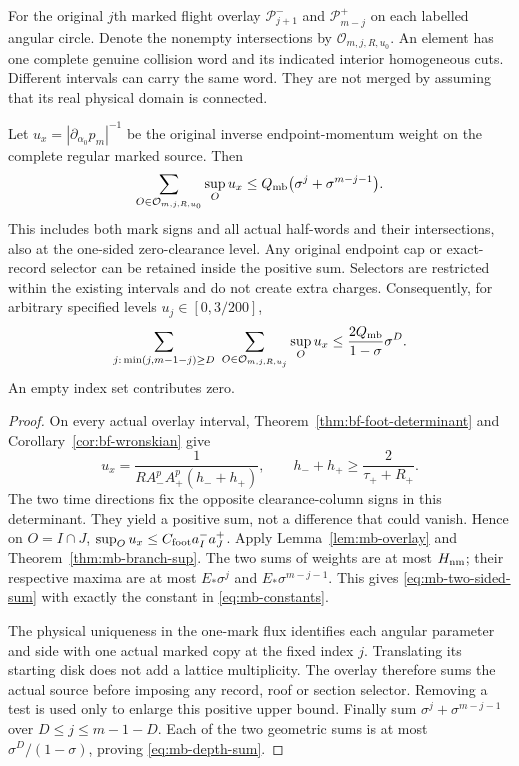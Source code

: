 For the original $j$th marked flight overlay
$\mathcal P_{j+1}^-$ and $\mathcal P_{m-j}^+$ on each labelled
angular circle.  Denote the nonempty intersections by
$\mathcal O_{m,j,R,u_0}$.  An element has one complete genuine
collision word and its indicated interior homogeneous cuts.
Different intervals can carry the same word.  They are not merged
by assuming that its real physical domain is connected.

\begin{theorem}
\label{thm:mb-two-sided-sum}
Let $u_x=|\partial_{\alpha_0}p_m|^{-1}$ be the original inverse
endpoint-momentum weight on the complete regular marked source.
Then
\begin{equation}\label{eq:mb-two-sided-sum}
 \sum_{O\in\mathcal O_{m,j,R,u_0}}\sup_O u_x
       \le Q_{\rm mb}\bigl(\sigma^j+\sigma^{m-j-1}\bigr).
\end{equation}
This includes both mark signs and all actual half-words and their
intersections, also at the one-sided zero-clearance level.
Any original endpoint cap or exact-record selector can be retained
inside the positive sum.  Selectors are restricted within the
existing intervals and do not create extra charges.
Consequently, for arbitrary specified levels $u_j\in[0,3/200]$,
\begin{equation}\label{eq:mb-depth-sum}
 \sum_{j:\,\min(j,m-1-j)\ge D}
 \ \sum_{O\in\mathcal O_{m,j,R,u_j}}\sup_O u_x
       \le\frac{2Q_{\rm mb}}{1-\sigma}\sigma^D .
\end{equation}
An empty index set contributes zero.
\end{theorem}
\begin{proof}
On every actual overlay interval, Theorem~\ref{thm:bf-foot-determinant}
and Corollary~\ref{cor:bf-wronskian} give
\[
 u_x=\frac1{R A_-^pA_+^p(h_-+h_+)},\qquad
 h_-+h_+\ge\frac2{\tau_++R_+}.
\]
The two time directions fix the opposite clearance-column signs
in this determinant.  They yield a positive sum, not a difference
that could vanish.  Hence on $O=I\cap J$,
$\sup_Ou_x\le C_{\rm foot}a_I^-a_J^+$.
Apply Lemma~\ref{lem:mb-overlay} and
Theorem~\ref{thm:mb-branch-sup}.  The two sums of weights are at
most $H_{\rm nm}$; their respective maxima are at most
$E_*\sigma^j$ and $E_*\sigma^{m-j-1}$.
This gives \eqref{eq:mb-two-sided-sum} with exactly the constant
in \eqref{eq:mb-constants}.

The physical uniqueness in the one-mark flux identifies each
angular parameter and side with one actual marked copy at the
fixed index $j$.  Translating its starting disk does not add a
lattice multiplicity.  The overlay therefore sums the actual
source before imposing any record, roof or section selector.
Removing a test is used only to enlarge this positive upper bound.
Finally sum
$\sigma^j+\sigma^{m-j-1}$ over $D\le j\le m-1-D$.
Each of the two geometric sums is at most
$\sigma^D/(1-\sigma)$, proving \eqref{eq:mb-depth-sum}.
\end{proof}

